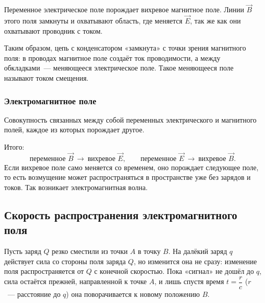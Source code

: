 \documentclass[12pt]{article}
\begin{document}
	\begin{statement}
		Переменное электрическое поле порождает вихревое магнитное поле. Линии $\vec{B}$ этого поля замкнуты и охватывают область, где меняется $\vec{E}$, так же как они охватывают проводник с током.
	\end{statement}

	\begin{note}
		Таким образом, цепь с конденсатором «замкнута» с точки зрения магнитного поля: в проводах магнитное поле создаёт ток проводимости, а между обкладками~--- меняющееся электрическое поле. Такое меняющееся поле называют током смещения.
	\end{note}

	\subsubsection{Электромагнитное поле}

	\begin{definition}
		Совокупность связанных между собой переменных электрического и магнитного полей, каждое из которых порождает другое.
	\end{definition}

	Итого:
	\[
		\text{переменное } \vec{B} \ \longrightarrow \ \text{вихревое } \vec{E}, \qquad \text{переменное } \vec{E} \ \longrightarrow \ \text{вихревое } \vec{B}.
	\]
	Если вихревое поле само меняется со временем, оно порождает следующее поле, то есть возмущение может распространяться в пространстве уже без зарядов и токов. Так возникает электромагнитная волна.

	\subsection{Скорость распространения электромагнитного поля}

	Пусть заряд $Q$ резко сместили из точки $A$ в точку $B$. На далёкий заряд $q$ действует сила со стороны поля заряда $Q$, но изменится она не сразу: изменение поля распространяется от $Q$ с конечной скоростью. Пока «сигнал» не дошёл до $q$, сила остаётся прежней, направленной к точке $A$, и лишь спустя время $t = \dfrac{r}{c}$ ($r$~--- расстояние до $q$) она поворачивается к новому положению $B$.
\end{document}
